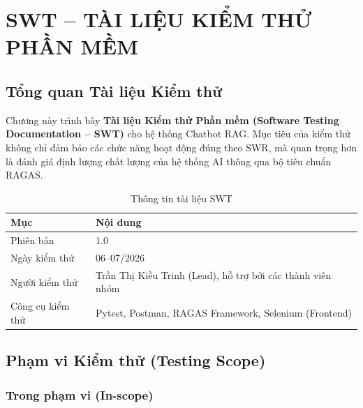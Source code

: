 ﻿%
\chapter{SWT -- TÀI LIỆU KIỂM THỬ PHẦN MỀM}

\section{Tổng quan Tài liệu Kiểm thử}

Chương này trình bày \textbf{Tài liệu Kiểm thử Phần mềm (Software Testing Documentation -- SWT)} cho hệ thống Chatbot RAG. Mục tiêu của kiểm thử không chỉ đảm bảo các chức năng hoạt động đúng theo SWR, mà quan trọng hơn là đánh giá định lượng chất lượng của hệ thống AI thông qua bộ tiêu chuẩn RAGAS.

\begin{table}[H]
  \centering
  \caption{Thông tin tài liệu SWT}
  \label{tab:swt-info}
  \renewcommand{\arraystretch}{1.4}
  \begin{tabularx}{\textwidth}{|l|X|}
    \hline
    \rowcolor{blue!10}
    \textbf{Mục} & \textbf{Nội dung} \\
    \hline
    Phiên bản & 1.0 \\
    \hline
    Ngày kiểm thử & 06--07/2026 \\
    \hline
    Người kiểm thử & Trần Thị Kiều Trinh (Lead), hỗ trợ bởi các thành viên nhóm \\
    \hline
    Công cụ kiểm thử & Pytest, Postman, RAGAS Framework, Selenium (Frontend) \\
    \hline
  \end{tabularx}
\end{table}

\section{Phạm vi Kiểm thử (Testing Scope)}

\subsection{Trong phạm vi (In-scope)}

